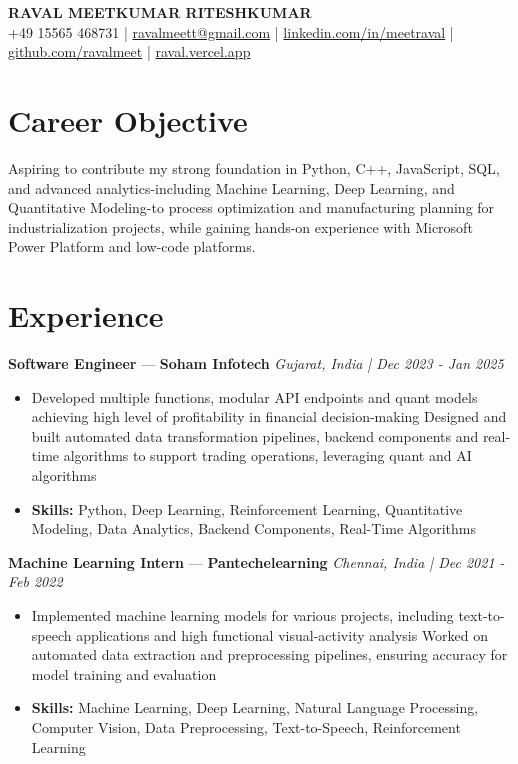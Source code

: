 \documentclass[a4paper,10pt]{article}
\begin{document}
\begin{center}
  {\Large\bfseries RAVAL MEETKUMAR RITESHKUMAR}\\[2pt]
  {\small +49 15565 468731 \;|\; \href{mailto:ravalmeett@gmail.com}{ravalmeett@gmail.com} \;|\; \href{https://www.linkedin.com/in/meetraval/}{linkedin.com/in/meetraval} \;|\; \href{https://github.com/ravalmeet}{github.com/ravalmeet} \;|\; \href{https://raval.vercel.app/}{raval.vercel.app}}
\end{center}
\vspace{-3pt}

\section*{Career Objective}
Aspiring to contribute my strong foundation in Python, C++, JavaScript, SQL, and advanced analytics-including Machine Learning, Deep Learning, and Quantitative Modeling-to process optimization and manufacturing planning for industrialization projects, while gaining hands-on experience with Microsoft Power Platform and low-code platforms.\par

\section*{Experience}
\textbf{Software Engineer} — \textbf{Soham Infotech} \hfill \textit{Gujarat, India \;|\; Dec 2023 - Jan 2025}\par
\vspace{1pt}
\begin{itemize}
  \item Developed multiple functions, modular API endpoints and quant models achieving high level of profitability in financial decision-making Designed and built automated data transformation pipelines, backend components and real-time algorithms to support trading operations, leveraging quant and AI algorithms
  \item \textbf{Skills:} Python, Deep Learning, Reinforcement Learning, Quantitative Modeling, Data Analytics, Backend Components, Real-Time Algorithms
\end{itemize}
\vspace{3pt}
\textbf{Machine Learning Intern} — \textbf{Pantechelearning} \hfill \textit{Chennai, India \;|\; Dec 2021 - Feb 2022}\par
\vspace{1pt}
\begin{itemize}
  \item Implemented machine learning models for various projects, including text-to-speech applications and high functional visual-activity analysis Worked on automated data extraction and preprocessing pipelines, ensuring accuracy for model training and evaluation
  \item \textbf{Skills:} Machine Learning, Deep Learning, Natural Language Processing, Computer Vision, Data Preprocessing, Text-to-Speech, Reinforcement Learning
\end{itemize}
\end{document}
